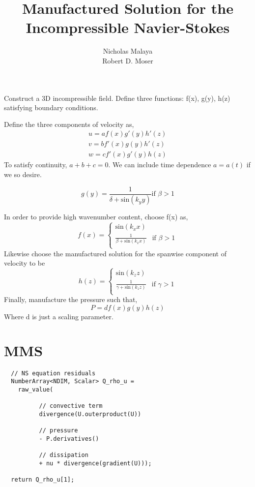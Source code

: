\documentclass{article}
\title{\bf{Manufactured Solution for the Incompressible Navier-Stokes}}
\author{Nicholas Malaya \\ Robert D. Moser} \date{}
\begin{document}
\maketitle

Construct a 3D incompressible field. Define three functions: f(x), g(y),
h(z) satisfying boundary conditions. 

Define the three components of velocity as,
\begin{align}
u = a f(x)  g'(y)  h'(z) \\
v = b f'(x) g(y)   h'(z) \\
w = c f'(x) g'(y)  h(z) 
\end{align}
To satisfy continuity, $a+b+c=0$. We can include time dependence
$a=a(t)$ if we so desire.

\begin{equation}
 g(y) = \frac{1}{\delta + \text{sin}(k_y y)} \mbox{if } \beta > 1
\end{equation}

In order to provide high wavenumber content, choose f(x) as,
\begin{equation}
 f(x) =
  \begin{cases}
   \text{sin}(k_x x)  \\
   \frac{1}{\beta + \text{sin}(k_x x)} & \mbox{if } \beta > 1 \\
  \end{cases}
\end{equation}
Likewise choose the manufactured solution for the spanwise component of
velocity to be
\begin{equation}
 h(z) =
  \begin{cases}
   \text{sin}(k_z z)  \\
   \frac{1}{\gamma + \text{sin}(k_z z)} & \mbox{if } \gamma > 1 \\
  \end{cases}
\end{equation}
Finally, manufacture the pressure such that, 
\begin{equation}
 P = d f(x) g(y) h(z)
\end{equation}
Where d is just a scaling parameter. 
\newpage
\section{MMS}
\begin{verbatim}
  // NS equation residuals
  NumberArray<NDIM, Scalar> Q_rho_u = 
    raw_value(

	      // convective term
	      divergence(U.outerproduct(U))

	      // pressure
	      - P.derivatives()

	      // dissipation
	      + nu * divergence(gradient(U)));

  return Q_rho_u[1];
\end{verbatim}
\end{document}
